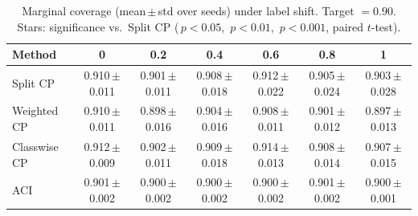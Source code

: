 \begin{table}[t]\centering
\caption{Marginal coverage (mean\,$\pm$\,std over seeds) under label shift. Target $=0.90$. Stars: significance vs.\ Split CP (\*\,$p{<}0.05$, \*\*\,$p{<}0.01$, \*\*\*\,$p{<}0.001$, paired $t$-test).}
\label{tab:coverage_label}
\begin{tabular}{lcccccc}
\toprule
Method & 0 & 0.2 & 0.4 & 0.6 & 0.8 & 1 \\
\midrule
Split CP & 0.910\,{\scriptsize$\pm$0.011} & 0.901\,{\scriptsize$\pm$0.011} & 0.908\,{\scriptsize$\pm$0.018} & 0.912\,{\scriptsize$\pm$0.022} & 0.905\,{\scriptsize$\pm$0.024} & 0.903\,{\scriptsize$\pm$0.028} \\
Weighted CP & 0.910\,{\scriptsize$\pm$0.011} & 0.898\,{\scriptsize$\pm$0.016} & 0.904\,{\scriptsize$\pm$0.016} & 0.908\,{\scriptsize$\pm$0.011} & 0.901\,{\scriptsize$\pm$0.012} & 0.897\,{\scriptsize$\pm$0.013} \\
Classwise CP & 0.912\,{\scriptsize$\pm$0.009} & 0.902\,{\scriptsize$\pm$0.011} & 0.909\,{\scriptsize$\pm$0.018} & 0.914\,{\scriptsize$\pm$0.013} & 0.908\,{\scriptsize$\pm$0.014} & 0.907\,{\scriptsize$\pm$0.015} \\
ACI & 0.901\,{\scriptsize$\pm$0.002} & 0.900\,{\scriptsize$\pm$0.002} & 0.900\,{\scriptsize$\pm$0.002} & 0.900\,{\scriptsize$\pm$0.002} & 0.901\,{\scriptsize$\pm$0.002} & 0.900\,{\scriptsize$\pm$0.001} \\
\bottomrule
\end{tabular}
\end{table}